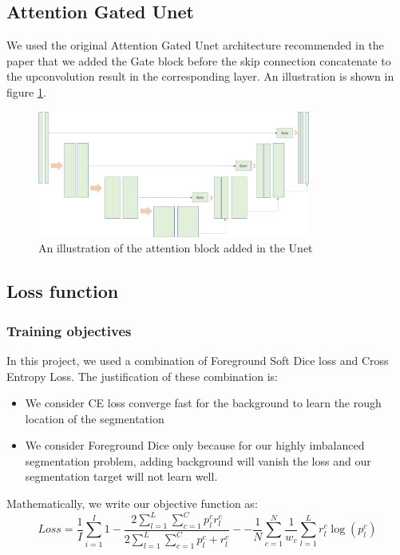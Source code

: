 \subsection{Attention Gated Unet}
We used the original Attention Gated Unet architecture recommended in the paper \cite{Attention_gate_network} that we added the Gate block before the skip connection concatenate to the upconvolution result in the corresponding layer.
An illustration is shown in figure \ref{fig:attention_gate}.
\begin{figure}
	\centering
	\includegraphics[width=0.8\textwidth]{img/Net_arch/attention_gate}
	\caption{An illustration of the attention block added in the Unet}	
	\label{fig:attention_gate}
\end{figure}

\subsection{Loss function}
\subsubsection{Training objectives}
In this project, we used a combination of Foreground Soft Dice loss and Cross Entropy Loss. The justification of these combination is:
\begin{itemize}
	\item We consider CE loss converge fast for the background to learn the rough location of the segmentation
	\item We consider Foreground Dice only because for our highly imbalanced segmentation problem, adding background will vanish the loss and our segmentation target will not learn well.
\end{itemize}
Mathematically, we write our objective function as:
$$Loss=\frac{1}{I} \sum_{i=1}^{I} 1-\frac{2 \sum_{l=1}^{L} \sum_{c=1}^{C} p_{l}^{c} r_{l}^{c}}{2 \sum_{l=1}^{L} \sum_{c=1}^{C} p_{l}^{c}+r_{l}^{c}} - -\frac{1}{N} \sum_{c=1}^{N} \frac{1}{w_{c}} \sum_{l=1}^{L} r_{l}^{c} \log \left(p_{l}^{c}\right)$$

